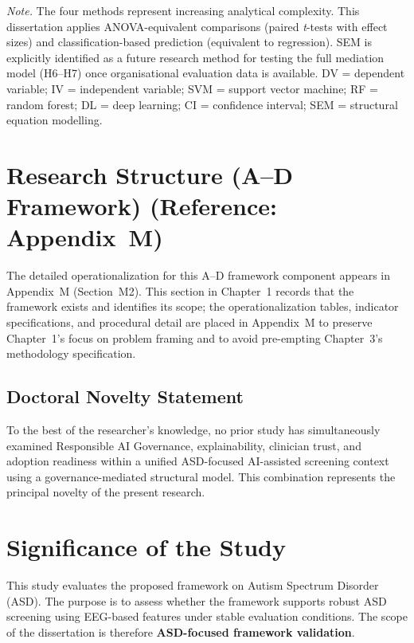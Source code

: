 \vspace{0.5em}
\noindent\textit{Note.} The four methods represent increasing analytical complexity. This dissertation applies ANOVA-equivalent comparisons (paired \textit{t}-tests with effect sizes) and classification-based prediction (equivalent to regression). SEM is explicitly identified as a future research method for testing the full mediation model (H6--H7) once organisational evaluation data is available. DV = dependent variable; IV = independent variable; SVM = support vector machine; RF = random forest; DL = deep learning; CI = confidence interval; SEM = structural equation modelling.
\fi %

\section{Research Structure (A--D Framework) (Reference: Appendix~M)}

\noindent The detailed operationalization for this A--D framework component appears in Appendix~M (Section~M2). This section in Chapter~1 records that the framework exists and identifies its scope; the operationalization tables, indicator specifications, and procedural detail are placed in Appendix~M to preserve Chapter~1's focus on problem framing and to avoid pre-empting Chapter~3's methodology specification.


\subsection{Doctoral Novelty Statement}
\label{sec:doctoral_novelty_statement}

\noindent To the best of the researcher's knowledge, no prior study has simultaneously examined Responsible AI Governance, explainability, clinician trust, and adoption readiness within a unified ASD-focused AI-assisted screening context using a governance-mediated structural model. This combination represents the principal novelty of the present research.

\section{Significance of the Study}
\label{sec:scope}

This study evaluates the proposed framework on Autism Spectrum Disorder (ASD). The purpose is to assess whether the framework supports robust ASD screening using EEG-based features under stable evaluation conditions. The scope of the dissertation is therefore \textbf{ASD-focused framework validation}.


